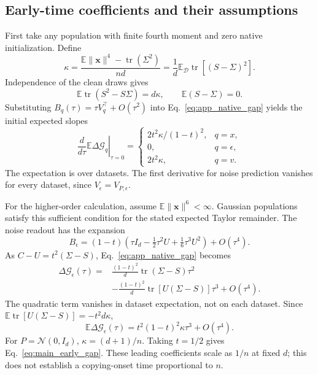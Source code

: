 \subsection{Early-time coefficients and their assumptions}
First take any population with finite fourth moment and zero native
initialization. Define
\begin{equation}
 \kappa=\frac{\mathbb E\|\mathbf x\|^4
                  -\operatorname{tr}(\Sigma^2)}{nd}
 =\frac1d\mathbb E_{\mathcal D}\operatorname{tr}[(S-\Sigma)^2].
 \label{eq:app_kappa}
\end{equation}
Independence of the clean draws gives
\[
 \mathbb E\operatorname{tr}(S^2-S\Sigma)=d\kappa,
 \qquad \mathbb E(S-\Sigma)=0.
\]
Substituting $B_q(\tau)=\tau V_q^\top+O(\tau^2)$ into
Eq.~\eqref{eq:app_native_gap} yields the initial expected slopes
\begin{equation}
 \left.\frac{d}{d\tau}\mathbb E\Delta\mathcal G_q\right|_{\tau=0}
 =\begin{cases}
 2t^2\kappa/(1-t)^2,&q=x,\\
 0,&q=\epsilon,\\
 2t^2\kappa,&q=v.
 \end{cases}
 \label{eq:app_linear_slopes}
\end{equation}
The expectation is over datasets. The first derivative for noise prediction
vanishes for every dataset, since $V_\epsilon=V_{P,\epsilon}$.

For the higher-order calculation, assume $\mathbb E\|\mathbf x\|^6<\infty$.
Gaussian populations satisfy this sufficient condition for the stated
expected Taylor remainder.
The noise readout has the expansion
\[
 B_\epsilon=(1-t)\left(\tau I_d-\tfrac12\tau^2U
                            +\tfrac16\tau^3U^2\right)+O(\tau^4).
\]
As $C-U=t^2(\Sigma-S)$, Eq.~\eqref{eq:app_native_gap} becomes
\begin{align}
 \Delta\mathcal G_\epsilon(\tau)
 ={}&\frac{(1-t)^2}{d}\operatorname{tr}(\Sigma-S)\tau^2\nonumber\\
 &-\frac{(1-t)^2}{d}\operatorname{tr}[U(\Sigma-S)]\tau^3
 +O(\tau^4).
 \label{eq:app_noise_expansion}
\end{align}
The quadratic term vanishes in dataset expectation, not on each dataset.
Since $\mathbb E\operatorname{tr}[U(\Sigma-S)]=-t^2d\kappa$,
\begin{equation}
 \mathbb E\Delta\mathcal G_\epsilon(\tau)
 =t^2(1-t)^2\kappa\tau^3+O(\tau^4).
 \label{eq:app_noise_cubic}
\end{equation}
For $P=\mathcal N(0,I_d)$, $\kappa=(d+1)/n$.
Taking $t=1/2$ gives Eq.~\eqref{eq:main_early_gap}.
These leading coefficients scale as $1/n$ at fixed $d$; this does not
establish a copying-onset time proportional to $n$.

